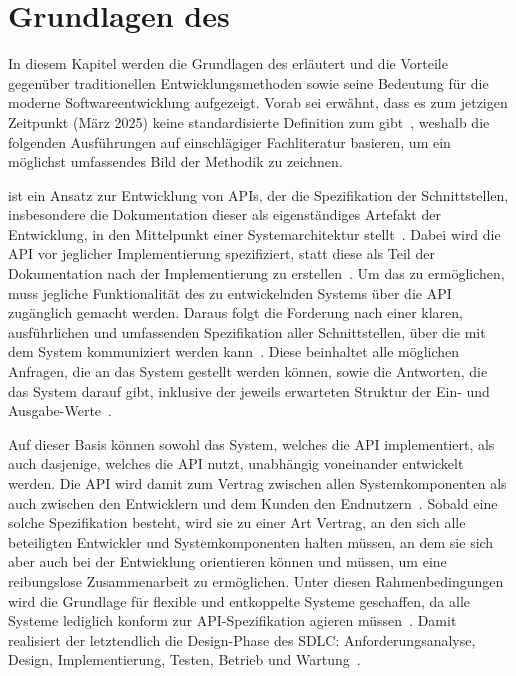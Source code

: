 \chapter{Grundlagen des \AFAes}
In diesem Kapitel werden die Grundlagen des \AFAes erläutert und die Vorteile gegenüber traditionellen Entwicklungsmethoden sowie seine Bedeutung für die moderne Softwareentwicklung aufgezeigt.
Vorab sei erwähnt, dass es zum jetzigen Zeitpunkt (März 2025) keine standardisierte Definition zum \AFA gibt~\cite[77]{bea22}, weshalb die folgenden Ausführungen auf einschlägiger Fachliteratur basieren, um ein möglichst umfassendes Bild der Methodik zu zeichnen.

\AF ist ein Ansatz zur Entwicklung von \acp{API}, der die Spezifikation der Schnittstellen, insbesondere die Dokumentation dieser als eigenständiges Artefakt der Entwicklung, in den Mittelpunkt einer Systemarchitektur stellt~\cite[2]{kul23}.
Dabei wird die \ac{API} vor jeglicher Implementierung spezifiziert, statt diese als Teil der Dokumentation nach der Implementierung zu erstellen~\cites[1627]{cha21}[349]{de23}.
Um das zu ermöglichen, muss jegliche Funktionalität des zu entwickelnden Systems über die \ac{API} zugänglich gemacht werden.
Daraus folgt die Forderung nach einer klaren, ausführlichen und umfassenden Spezifikation aller Schnittstellen, über die mit dem System kommuniziert werden kann~\cite[75]{bea22}.
Diese beinhaltet alle möglichen Anfragen, die an das System gestellt werden können, sowie die Antworten, die das System darauf gibt, inklusive der jeweils erwarteten Struktur der Ein- und Ausgabe-Werte~\cite[350]{de23}.

Auf dieser Basis können sowohl das System, welches die \ac{API} implementiert, als auch dasjenige, welches die \ac{API} nutzt, unabhängig voneinander entwickelt werden.
Die \ac{API} wird damit zum Vertrag zwischen allen Systemkomponenten als auch zwischen den Entwicklern und dem Kunden \bzw den Endnutzern~\cite[1627]{cha21}.
Sobald eine solche Spezifikation besteht, wird sie zu einer Art Vertrag, an den sich alle beteiligten Entwickler und Systemkomponenten halten müssen, an dem sie sich aber auch bei der Entwicklung orientieren können und müssen, um eine reibungslose Zusammenarbeit zu ermöglichen.
Unter diesen Rahmenbedingungen wird die Grundlage für flexible und entkoppelte Systeme geschaffen, da alle Systeme lediglich konform zur \ac{API}-Spezifikation agieren müssen~\cite[350,354,360]{de23}.
Damit realisiert der \AFA letztendlich die Design-Phase des \ac{SDLC}: Anforderungsanalyse, Design, Implementierung, Testen, Betrieb und Wartung~\cite{vol22}.

